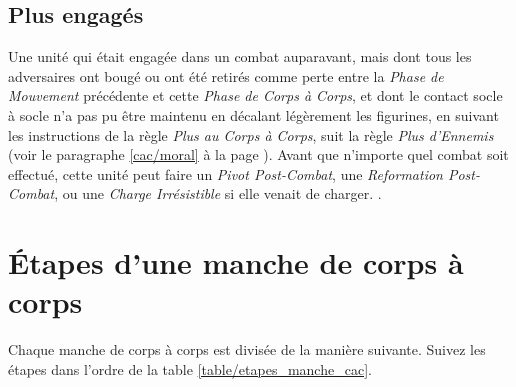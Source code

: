 \subsection{Plus engagés}

Une unité qui était engagée dans un combat auparavant, mais dont tous les adversaires ont bougé ou ont été retirés comme perte entre la \emph{Phase de Mouvement} précédente et cette \emph{Phase de Corps à Corps}, et dont le contact socle à socle n'a pas pu être maintenu en décalant légèrement les figurines, en suivant les instructions de la règle \emph{Plus au Corps à Corps}, suit la règle \emph{Plus d'Ennemis} (voir le paragraphe \ref{cac/moral} à la page \pageref{cac/plus_ennemis}). Avant que n'importe quel combat soit effectué, cette unité peut faire un \emph{Pivot Post-Combat}, une \emph{Reformation Post-Combat}, ou une \emph{Charge Irrésistible} si elle venait de charger. .

\section{Étapes d'une manche de corps à corps}
\label{etapes_manche_cac}

Chaque manche de corps à corps est divisée de la manière suivante. Suivez les étapes dans l'ordre de la table \ref{table/etapes_manche_cac}.

